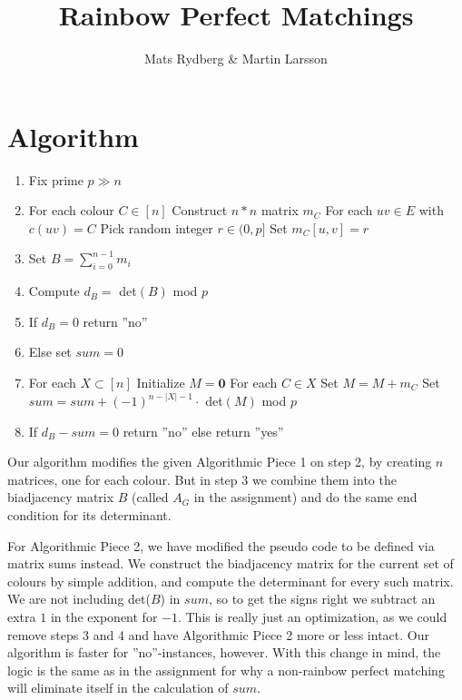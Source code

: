 \documentclass{tufte-handout}
\title{\sf Rainbow Perfect Matchings}
\author{Mats Rydberg \& Martin Larsson}
\begin{document}
\maketitle

\section{Algorithm}
\begin{enumerate}
\item Fix prime $p \gg n$ 
\item For each colour $C \in [n]$
\subitem Construct $n \ast n$ matrix $m_C$
\subitem For each $uv \in E$ with $ c(uv) = C$
\subsubitem Pick random integer $r \in (0,p]$
\subsubitem Set $m_C[u,v] = r$
\item Set $B = \sum_{i = 0}^{n-1}m_i$
\item Compute $d_B =$ det$(B)$ mod $p$
\item If $d_B = 0$ return ''no''
\item Else set $sum = 0$
\item For each $X \subset [n]$
\subitem Initialize $M = \mathbf{0}$ 
\subitem For each $C \in X$
\subsubitem Set $M = M + m_C$
\subitem Set $sum = sum + (-1)^{n-|X|-1} \cdot$ det$(M)$ mod $p$
\item If $d_B - sum = 0$ return ''no'' else return ''yes''
\end{enumerate}

\noindent Our algorithm modifies the given Algorithmic Piece 1 on step 2, by creating $n$ matrices, one for each colour. But in step 3 we combine them into the biadjacency matrix $B$ (called $A_G$ in the assignment) and do the same end condition for its determinant.

For Algorithmic Piece 2, we have modified the pseudo code to be defined via matrix sums instead. We construct the biadjacency matrix for the current set of colours by simple addition, and compute the determinant for every such matrix. We are not including det($B$) in $sum$, so to get the signs right we subtract an extra $1$ in the exponent for $-1$. This is really just an optimization, as we could remove steps 3 and 4 and have Algorithmic Piece 2 more or less intact. Our algorithm is faster for ''no''-instances, however. With this change in mind, the logic is the same as in the assignment for why a non-rainbow perfect matching will eliminate itself in the calculation of $sum$.
\newpage
\end{document}
